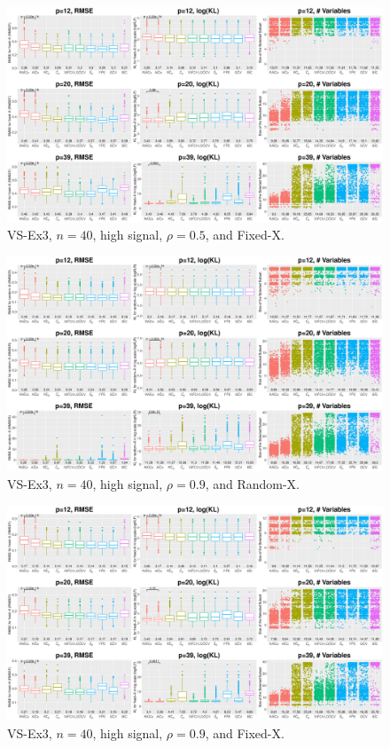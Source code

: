 \begin{figure}[!ht]
\centering
\includegraphics[width=\textwidth]{figures/supplement/fixedx_VS-Ex3_n40_hsnr_rho05.eps}
\caption{VS-Ex3, $n=40$, high signal, $\rho=0.5$, and Fixed-X.}
\end{figure}
\clearpage
\begin{figure}[!ht]
\centering
\includegraphics[width=\textwidth]{figures/supplement/randomx_VS-Ex3_n40_hsnr_rho09.eps}
\caption{VS-Ex3, $n=40$, high signal, $\rho=0.9$, and Random-X.}
\end{figure}
\begin{figure}[!ht]
\centering
\includegraphics[width=\textwidth]{figures/supplement/fixedx_VS-Ex3_n40_hsnr_rho09.eps}
\caption{VS-Ex3, $n=40$, high signal, $\rho=0.9$, and Fixed-X.}
\end{figure}
